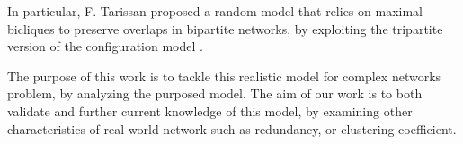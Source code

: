 \documentclass[table]{report}
\begin{document}
\medbreak

In particular, F. Tarissan \cite{fabien_lionel} proposed a random model that relies on maximal bicliques to preserve overlaps in bipartite networks, by exploiting the tripartite version of the configuration model \cite{fabien_lionel}\cite{coupechoux}.

\medbreak

The purpose of this work is to tackle this realistic model for complex networks problem, by analyzing the purposed model. The aim of our work is to both validate and further current knowledge of this model, by examining other characteristics of real-world network such as redundancy, or clustering coefficient. 
%
%

%
%
%
%
%
%
%
%
%
%
%
%
%
%
%
%
\end{document}

